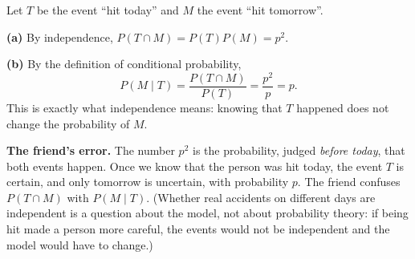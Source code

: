 Let $T$ be the event ``hit today'' and $M$ the event ``hit tomorrow''.

\textbf{(a)} By independence, $P(T\cap M)=P(T)P(M)=\boxed{p^2}$.

\textbf{(b)} By the definition of conditional probability,
\[
P(M\mid T)=\dfrac{P(T\cap M)}{P(T)}=\dfrac{p^2}{p}=\boxed{p}.
\]
This is exactly what independence means: knowing that $T$ happened does not change the probability of $M$.

\textbf{The friend's error.} The number $p^2$ is the probability, judged \emph{before today}, that both events happen. Once we know that the person was hit today, the event $T$ is certain, and only tomorrow is uncertain, with probability $p$. The friend confuses $P(T\cap M)$ with $P(M\mid T)$. (Whether real accidents on different days are independent is a question about the model, not about probability theory: if being hit made a person more careful, the events would not be independent and the model would have to change.)
